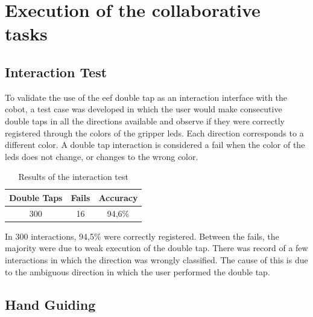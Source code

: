 \section{Execution of the collaborative tasks}

\subsection{Interaction Test}

\par To validate the use of the \ac{eef} double tap as an interaction interface with the cobot, a test case was developed in which the user would make consecutive double taps in all the directions available and observe if they were correctly registered through the colors of the gripper \acsp{led}. Each direction corresponds to a different color. A double tap interaction is considered a fail when the color of the \acsp{led} does not change, or changes to the wrong color.

\begin{table}[h]
    \centering
    \begin{tabular}{|c|c|c|}
    \hline
    \textbf{Double Taps} & \textbf{Fails} & \textbf{Accuracy} \\ \hline
    300 & 16 & 94,6\% \\ \hline
    \end{tabular}
    \caption{Results of the interaction test}
    \label{tab:interaction_test}
\end{table}

\par In 300 interactions, 94,5\% were correctly registered. Between the fails, the majority were due to weak execution of the double tap. There was record of a few interactions in which the direction was wrongly classified. The cause of this is due to the ambiguous direction in which the user performed the double tap.

\subsection{Hand Guiding}


